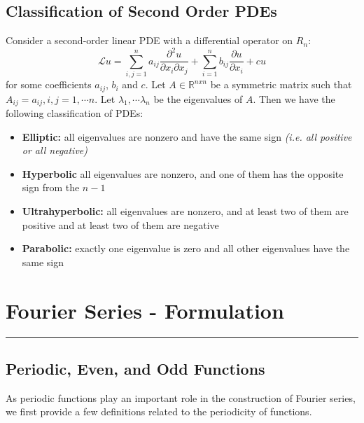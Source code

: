 \documentclass[11pt]{article}
\newcommand{\Lagr}{\mathcal{L}}
\newcommand{\R}{\mathbb{R}}
\begin{document}
\subsection{Classification of Second Order PDEs}
Consider a second-order linear PDE with a differential operator on $R_n$:
$$ \Lagr u = \sum_{i,j=1}^n a_{ij} \frac{\partial ^2u}{\partial x_i \partial x_j} + \sum_{i=1}^n b_{ij} \frac{\partial u}{\partial x_i } + cu $$
for some coefficients $a_{ij}$, $b_i$ and $c$. Let $A \in \R ^{nxn}$ be a symmetric matrix such that $A_{ij} = a_{ij},  i, j = 1, \cdots  n$.  Let $\lambda_1, \cdots \lambda_n$ be the eigenvalues of $A$. Then we have the following classification of PDEs:
\begin{itemize}
\item \textbf{Elliptic:} all eigenvalues are nonzero and have the same sign\textit{ (i.e.  all positive or all negative)}
\item \textbf{Hyperbolic} all eigenvalues are nonzero, and one of them has the opposite sign from the $n-1$
\item \textbf{Ultrahyperbolic:} all eigenvalues are nonzero, and at least two of them are positive and at least two of them are negative
\item \textbf{Parabolic:} exactly one eigenvalue is zero and all other eigenvalues have the same sign
\end{itemize}

\pagebreak



\section{Fourier Series - Formulation}
\hrule \vspace{15pt}

\subsection{Periodic, Even, and Odd Functions}
As periodic functions play an important role in the construction of Fourier series, we first provide a few definitions related to the periodicity of functions.
\end{document}
